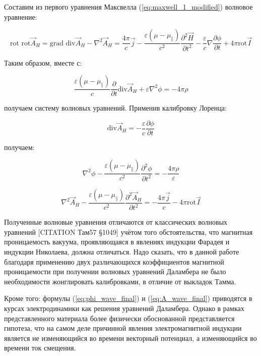 \documentclass[12pt, a4paper]{article}
\begin{document}
Составим из первого уравнения Максвелла (\ref{eq:maxwell_1_modified}) волновое уравнение:

\begin{equation}
\text{rot rot} \vec{A}_H = \text{grad div} \vec{A}_H - \nabla^2 \vec{A}_H = \frac{4\pi}{c} \vec{j} - \frac{\varepsilon (\mu - \mu_{\parallel})}{c^2} \frac{\partial^2 \vec{H}}{\partial t^2} - \frac{\varepsilon}{c} \nabla \frac{\partial \phi}{\partial t} + 4\pi \text{rot} \vec{I}
\label{eq:wave_equation_derivation}
\end{equation}

Таким образом, вместе с:

\begin{equation}
\frac{\varepsilon (\mu - \mu_{\parallel})}{c} \frac{\partial}{\partial t} \text{div} \vec{A}_H + \varepsilon \nabla^2 \phi = -4\pi \rho
\label{eq:phi_wave}
\end{equation}

получаем систему волновых уравнений. Применив калибровку Лоренца:

\begin{equation}
\text{div} \vec{A}_H = -\frac{\varepsilon}{c} \frac{\partial \phi}{\partial t}
\label{eq:lorentz_applied}
\end{equation}

получаем:

\begin{equation}
\nabla^2 \phi - \frac{\varepsilon (\mu - \mu_{\parallel})}{c^2} \frac{\partial^2 \phi}{\partial t^2} = -\frac{4\pi \rho}{\varepsilon}
\label{eq:phi_wave_final}
\end{equation}

\begin{equation}
\nabla^2 \vec{A}_H - \frac{\varepsilon (\mu - \mu_{\parallel})}{c^2} \frac{\partial^2 \vec{A}_H}{\partial t^2} = -\frac{4\pi \vec{j}}{c} - 4\pi \text{rot} \vec{I}
\label{eq:A_wave_final}
\end{equation}

Полученные волновые уравнения отличаются от классических волновых уравнений [CITATION Там57 §1049] учётом того обстоятельства, что магнитная проницаемость вакуума, проявляющаяся в явлениях индукции Фарадея и индукции Николаева, должна отличаться. Надо сказать, что в данной работе благодаря применению двух различающихся коэффициентов магнитной проницаемости при получении волновых уравнений Даламбера не было необходимости жонглировать калибровками, в отличие от выкладок Тамма.

Кроме того: формулы (\ref{eq:phi_wave_final}) и (\ref{eq:A_wave_final}) приводятся в курсах электродинамики как решения уравнений Даламбера. Однако в рамках представленного материала более физически обоснованной представляется гипотеза, что на самом деле причинной явления электромагнитной индукции является не изменяющийся во времени векторный потенциал, а изменяющийся во времени ток смещения.
\end{document}
